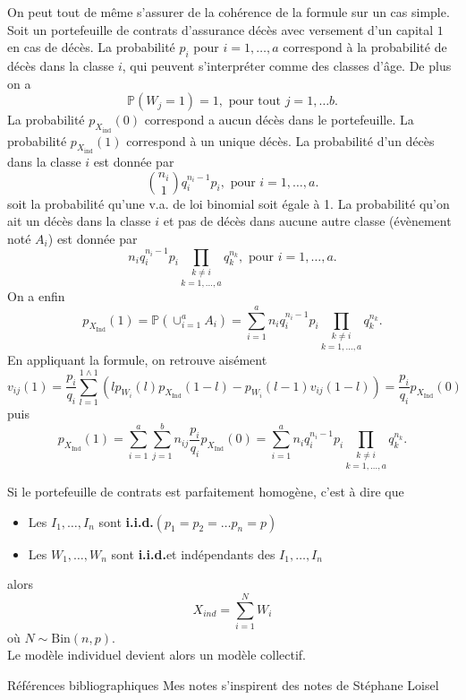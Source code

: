 \documentclass[8pt,notheorems]{beamer}
\def \P {\mathbb P}
\newcommand{\iid}{\textbf{i.i.d.}}
\theoremstyle{definition}
\theoremstyle{example}
\theoremstyle{mystyle}
\theoremstyle{plain}
\begin{document}
\begin{frame}[allowframebreaks]

On peut tout de même s'assurer de la cohérence de la formule sur un cas simple. Soit un portefeuille de contrats d'assurance décès avec versement d'un capital $1$ en cas de décès. La probabilité $p_i$ pour $i = 1,\ldots, a$ correspond à la probabilité de décès dans la classe $i$, qui peuvent s'interpréter comme des classes d'âge. De plus on a 
$$
\P(W_j = 1)=1,\text{ pour tout }j = 1, \ldots b.
$$ 
La probabilité $p_{X_{\text{ind}}}(0)$ correspond a aucun décès dans le portefeuille. La probabilité $p_{X_{\text{ind}}}(1)$ correspond à un unique décès. La probabilité d'un décès dans la classe $i$ est donnée par 
$$
\binom{n_i}{1}q_i^{n_i-1}p_i,\text{ pour }i = 1,\ldots, a.
$$  
soit la probabilité qu'une v.a. de loi binomial soit égale à 1. La probabilité qu'on ait un décès dans la classe $i$ et pas de décès dans aucune autre classe (évènement noté $A_i$) est donnée par 
$$
n_i q_i^{n_i-1}p_i\underset{k=1,\ldots, a}{\prod_{k\neq i}}q_k^{n_k},\text{ pour }i = 1,\ldots, a.
$$
On a enfin 
$$
p_{X_\text{Ind}}(1) = \P\left(\cup_{i=1}^{a}A_i\right) = \sum_{i=1}^{a} n_i q_i^{n_i-1}p_i\underset{k=1,\ldots, a}{\prod_{k\neq i}}q_k^{n_k}.
$$
En appliquant la formule, on retrouve aisément 
$$
v_{ij}(1) = \frac{p_i}{q_i}\sum_{l = 1}^{1\land 1}(lp_{W_i}(l)p_{X_{\text {Ind}}}(1-l)- p_{W_i}(l-1)v_{ij}(1-l))=\frac{p_i}{q_i}p_{X_{\text {Ind}}}(0)
$$
puis 
$$
p_{X_\text{Ind}}(1) = \sum_{i=1}^a\sum_{j = 1}^b n_{ij}\frac{p_i}{q_i}p_{X_{\text {Ind}}}(0) = \sum_{i=1}^a n_iq_i^{n_i-1}p_i\underset{k=1,\ldots, a}{\prod_{k\neq i}}q_k^{n_k}.
$$
\end{frame}
\begin{frame}
Si le portefeuille de contrats est parfaitement homogène, c'est à dire que
\begin{itemize}
    \item Les $I_1,\ldots,I_n$ sont \iid $(p_1=p_2=\ldots p_n=p)$
    \item Les $W_1,\ldots,W_n$ sont \iid et indépendants des $I_1,\ldots,I_n$ 
\end{itemize}
alors 
$$
X_{ind} = \sum_{i=1}^{N}W_i
$$
où $N\sim\text{Bin}(n,p)$. \\

Le modèle individuel devient alors un modèle collectif. 
\end{frame}
\begin{frame}[allowframebreaks]{Références bibliographiques}
Mes notes s'inspirent des notes de Stéphane Loisel \cite{Lo19}


\end{frame}
\end{document}
